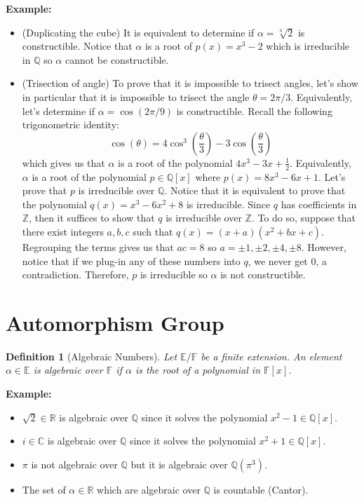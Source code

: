 \documentclass{article}
\newtheorem*{definition}{Definition}
\newcommand{\C}{\mathbb{C}}
\newcommand{\R}{\mathbb{R}}
\newcommand{\Q}{\mathbb{Q}}
\newcommand{\Z}{\mathbb{Z}}
\newcommand{\F}{\mathbb{F}}
\newcommand{\E}{\mathbb{E}}
\newenvironment{example}{\noindent\textbf{Example:} \vspace{-0.2cm}\begin{itemize}}{\end{itemize}}
\begin{document}
\begin{example}
    \item (Duplicating the cube) It is equivalent to determine if $\alpha = \sqrt[3]{2}$ is constructible. Notice that $\alpha$ is a root of $p(x) = x^3 - 2$ which is irreducible in $\Q$ so $\alpha$ cannot be constructible.
    \item (Trisection of angle) To prove that it is impossible to trisect angles, let's show in particular that it is impossible to trisect the angle $\theta = 2\pi / 3$. Equivalently, let's determine if $\alpha = \cos (2 \pi / 9)$ is constructible. Recall the following trigonometric identity:
    $$\cos(\theta) = 4 \cos^3 \left(\frac{\theta}{3}\right) - 3\cos \left(\frac{\theta}{3}\right)$$
    which gives us that $\alpha$ is a root of the polynomial $4x^3 - 3x + \frac{1}{2}$. Equivalently, $\alpha$ is a root of the polynomial $p \in \Q[x]$ where $p(x) = 8x^3 - 6x + 1$. Let's prove that $p$ is irreducible over $\Q$. Notice that it is equivalent to prove that the polynomial $q(x) = x^3 - 6x^2 + 8$ is irreducible. Since $q$ has coefficients in $\Z$, then it suffices to show that $q$ is irreducible over $\Z$. To do so, suppose that there exist integers $a,b,c$ such that $q(x) = (x + a)(x^2 + bx + c)$. Regrouping the terms gives us that $ac = 8$ so $a = \pm 1, \pm 2, \pm 4, \pm 8$. However, notice that if we plug-in any of these numbers into $q$, we never get 0, a contradiction. Therefore, $p$ is irreducible so $\alpha$ is not constructible. 
\end{example}

\section{Automorphism Group}

\begin{definition}[Algebraic Numbers]
    Let $\E / \F$ be a finite extension. An element $\alpha \in \E$ is algebraic over $\F$ if $\alpha$ is the root of a polynomial in $\F[x]$.
\end{definition}

\begin{example}
    \item $\sqrt{2} \in \R$ is algebraic over $\Q$ since it solves the polynomial $x^2 - 1 \in \Q[x]$.
    \item $i \in \C$ is algebraic over $\Q$ since it solves the polynomial $x^2 + 1 \in \Q[x]$.
    \item $\pi$ is not algebraic over $\Q$ but it is algebraic over $\Q(\pi^3)$.
    \item The set of $\alpha \in \R$ which are algebraic over $\Q$ is countable (Cantor).
\end{example}
\end{document}
